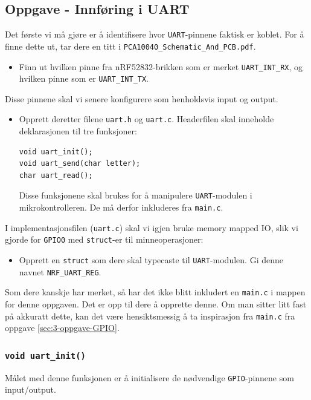 \subsection{Oppgave - Innføring i UART}

Det første vi må gjøre er å identifisere hvor \verb|UART|-pinnene faktisk er koblet. For å finne dette ut, tar dere en titt i \verb|PCA10040_Schematic_And_PCB.pdf|. 

\begin{itemize}
    \item Finn ut hvilken pinne fra nRF52832-brikken som er merket \verb|UART_INT_RX|, og hvilken pinne som er \verb|UART_INT_TX|.
\end{itemize}

 Disse pinnene skal vi senere konfigurere som henholdsvis input og output.
 
 \begin{itemize}
     \item Opprett deretter filene \verb|uart.h| og \verb|uart.c|. Headerfilen skal inneholde deklarasjonen til tre funksjoner:

\begin{lstlisting}
void uart_init();
void uart_send(char letter);
char uart_read();
\end{lstlisting} 
Disse funksjonene skal brukes for å manipulere \verb|UART|-modulen i mikrokontrolleren. De må derfor inkluderes fra \verb|main.c|.
 \end{itemize}
 
 I implementasjonsfilen (\verb|uart.c|) skal vi igjen bruke memory mapped IO, slik vi gjorde for \verb|GPIO0| med \verb|struct|-er til minneoperasjoner:
 
 \begin{itemize}
    \item Opprett en \verb|struct| som dere skal typecaste til \verb|UART|-modulen. Gi denne navnet \verb|NRF_UART_REG|.
\end{itemize}

Som dere kanskje har merket, så har det ikke blitt inkludert en \verb|main.c| i mappen for denne oppgaven. Det er opp til dere å opprette denne. Om man sitter litt fast på akkuratt dette, kan det være hensiktsmessig å ta inspirasjon fra \verb|main.c| fra oppgave \ref{sec:3-oppgave-GPIO}.





\cprotect\subsubsection{\lstinline{void uart_init()}}
Målet med denne funksjonen er å initialisere de nødvendige \verb|GPIO|-pinnene som input/output. 


